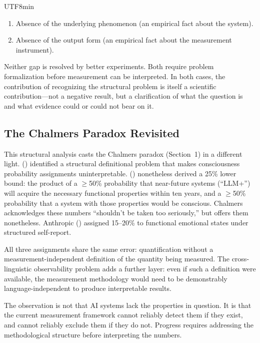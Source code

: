 \documentclass[12pt,a4paper]{article}
\begin{document}
\begin{CJK}{UTF8}{min}
\begin{enumerate}
\item Absence of the underlying phenomenon (an empirical fact about the system).
\item Absence of the output form (an empirical fact about the measurement
  instrument).
\end{enumerate}

Neither gap is resolved by better experiments. Both require problem formalization
before measurement can be interpreted. In both cases, the contribution of
recognizing the structural problem is itself a scientific contribution---not a
negative result, but a clarification of what the question is and what evidence
could or could not bear on it.

\subsection{The Chalmers Paradox Revisited}

This structural analysis casts the Chalmers paradox (Section~1) in a different
light. \citeauthor{chalmers1995} (\citeyear{chalmers1995}) identified a
structural definitional problem that makes consciousness probability assignments
uninterpretable. \citeauthor{chalmers2023llm} (\citeyear{chalmers2023llm})
nonetheless derived a 25\% lower bound: the product of a $\geq$50\% probability
that near-future systems (``LLM+'') will acquire the necessary functional
properties within ten years, and a $\geq$50\% probability that a system with
those properties would be conscious. Chalmers acknowledges these numbers
``shouldn't be taken too seriously,'' but offers them nonetheless. Anthropic
(\citeyear{anthropic2026systemcard}) assigned 15--20\% to functional emotional
states under structured self-report.

All three assignments share the same error: quantification without a
measurement-independent definition of the quantity being measured. The
cross-linguistic observability problem adds a further layer: even if such a
definition were available, the measurement methodology would need to be
demonstrably language-independent to produce interpretable results.

The observation is not that AI systems lack the properties in question. It is
that the current measurement framework cannot reliably detect them if they
exist, and cannot reliably exclude them if they do not. Progress requires
addressing the methodological structure before interpreting the numbers.


\end{CJK}
\end{document}
